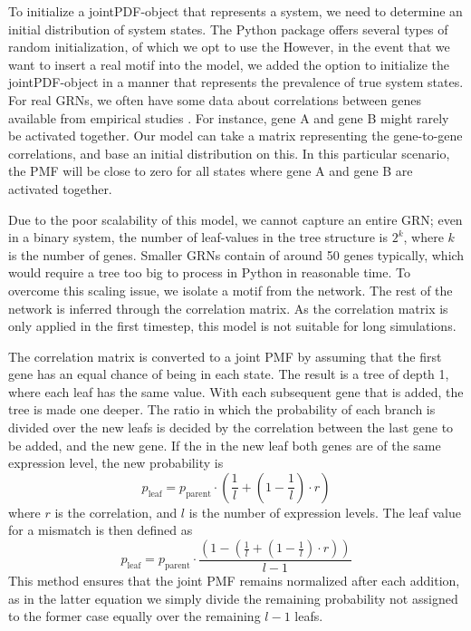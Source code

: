 \documentclass[../main.tex]{subfiles}
\begin{document}
To initialize a jointPDF-object that represents a system, we need to determine an initial distribution of system states.
The Python package offers several types of random initialization, of which we opt to use the %
However, in the event that we want to insert a real motif into the model, we added the option to initialize the jointPDF-object in a manner that represents the prevalence of true system states.
For real GRNs, we often have some data about correlations between genes available from empirical studies \cite{}.
For instance, gene A and gene B might rarely be activated together.
Our model can take a matrix representing the gene-to-gene correlations, and base an initial distribution on this.
In this particular scenario, the PMF will be close to zero for all states where gene A and gene B are activated together.

Due to the poor scalability of this model, we cannot capture an entire GRN; even in a binary system, the number of leaf-values in the tree structure is $2^k$, where $k$ is the number of genes.
Smaller GRNs contain of around 50 genes typically, which would require a tree too big to process in Python in reasonable time.
To overcome this scaling issue, we isolate a motif from the network.
The rest of the network is inferred through the correlation matrix.
As the correlation matrix is only applied in the first timestep, this model is not suitable for long simulations.

The correlation matrix is converted to a joint PMF by assuming that the first gene has an equal chance of being in each state.
The result is a tree of depth 1, where each leaf has the same value.
With each subsequent gene that is added, the tree is made one deeper.
The ratio in which the probability of each branch is divided over the new leafs is decided by the correlation between the last gene to be added, and the new gene.
If the in the new leaf both genes are of the same expression level, the new probability is
%
\begin{equation}
    p_\mathrm{leaf} = p_\mathrm{parent} \cdot (\frac{1}{l} + (1 - \frac{1}{l}) \cdot r)
\end{equation}
%
where $r$ is the correlation, and $l$ is the number of expression levels.
The leaf value for a mismatch is then defined as
%
\begin{equation}
    p_\mathrm{leaf} = p_\mathrm{parent} \cdot \frac{(1 - (\frac{1}{l} + (1 - \frac{1}{l}) \cdot r))}{l-1} 
\end{equation}
%
This method ensures that the joint PMF remains normalized after each addition, as in the latter equation we simply divide the remaining probability not assigned to the former case equally over the remaining $l-1$ leafs.
\end{document}
